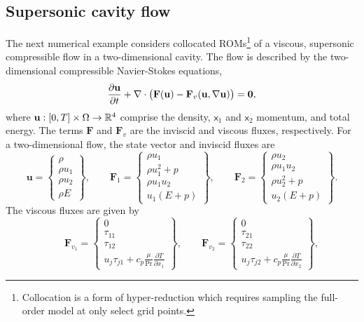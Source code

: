 \subsection{Supersonic cavity flow}
The next numerical example considers collocated ROMs\footnote{Collocation is a form of hyper-reduction which requires sampling the full-order model at only select grid points.} of a viscous, supersonic compressible flow in a two-dimensional cavity. 
The flow is described by the two-dimensional compressible Navier-Stokes equations,
\begin{equation}\label{eq:compressible_ns}
\frac{\partial \mathbf{u}}{\partial t} + \nabla \cdot \big( \mathbf{F}(\mathbf{u} ) - \mathbf{F}_v (\mathbf{u},\nabla \mathbf{u} )      \big) =\boldsymbol 0,
\end{equation}
where $\mathbf{u}: [0,T] \times \Omega \rightarrow \mathbb{R}^{4}$ comprise the density, $\mathsf{x}_1$ and $\mathsf{x}_2$ momentum, and total energy. The terms $\mathbf{F}$ and $ \mathbf{F}_v$ are the inviscid and viscous fluxes, respectively. For a two-dimensional flow, the state vector and inviscid fluxes are
$$
\mathbf{u} = \begin{Bmatrix}
\rho \\ \rho u_1 \\ \rho u_2 \\ \rho E \end{Bmatrix}, \qquad \mathbf{F}_{1} = \begin{Bmatrix} \rho u_1 \\ \rho u_1^2 +      p \\ \rho u_1 u_2 \\ u_1(E + p) \end{Bmatrix}, 
\qquad \mathbf{F}_{2} = \begin{Bmatrix} \rho u_2 \\ \rho u_1 u_2  \\ \rho u_2^2 + p \\ u_2(E + p) \end{Bmatrix}.
$$
The viscous fluxes are given by
$$
\qquad \mathbf{F}_{v_1} = \begin{Bmatrix} 0 \\ \tau_{11} \\ \tau_{12}  \\ u_j \tau_{j1} + c_p \frac{\mu}{\text{Pr}} \frac{\partial T}{\partial x_1}  \end{Bmatrix}, 
\qquad \mathbf{F}_{v_2} = \begin{Bmatrix} 0 \\ \tau_{21} \\ \tau_{22}  \\ u_j \tau_{j2} + c_p \frac{\mu}{\text{Pr}} \frac{\partial T}{\partial x_2}  \end{Bmatrix},
$$
